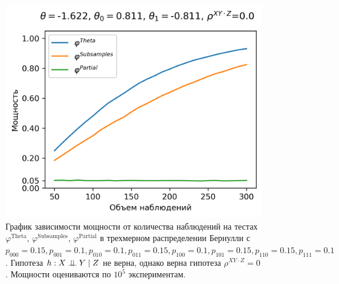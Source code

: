 \begin{figure}[H]
    \centering
    \includegraphics[scale=0.55]{images/graph4.png}
    \caption{График зависимости мощности от количества наблюдений
    на тестах $\varphi^{\text{Theta}}$, $\varphi^{\text{Subsamples}}$, $\varphi^{\text{Partial}}$
    в трехмерном распределении Бернулли с $p_{000}=0.15, p_{001}=0.1, 
    p_{010}=0.1, p_{011}=0.15,
    p_{100}=0.1, p_{101}=0.15, p_{110}=0.15, p_{111}=0.1$. 
    Гипотеза $h: X \perp\!\!\!\perp Y \mid Z$ не верна, однако верна гипотеза $\rho^{XY\cdot Z}=0$.
    Мощности оцениваются по $10^5$ экспериментам.} \label{fig:4}
\end{figure}

